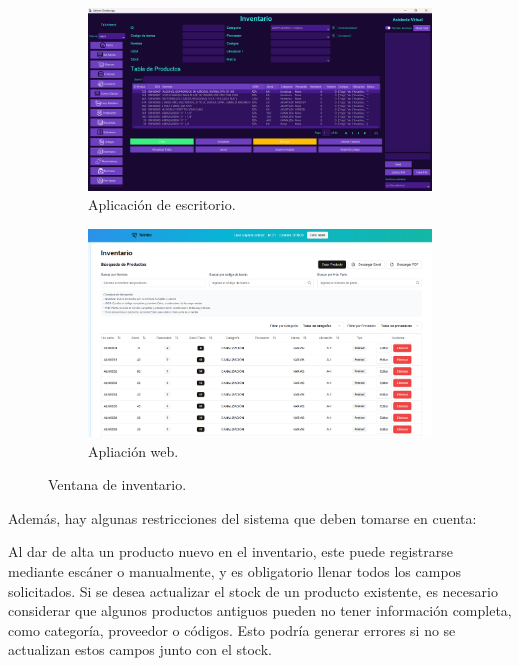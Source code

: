 \begin{figure}[ht!]
\centering
\begin{subfigure}{0.45\textwidth}
    \includegraphics[width=\textwidth]{imgs/InventoryApp.png}
    \caption{Aplicación de escritorio.}
    \label{fig:invent1}
\end{subfigure}
\hfill
\begin{subfigure}{0.45\textwidth}
    \includegraphics[width=\textwidth]{imgs/Almacen General/inventario/inventario_1_general.png}
    \caption{Apliación web.}
    \label{fig:invent2}
\end{subfigure}        
\caption{Ventana de inventario.}
\label{fig:inventory}
\end{figure}




Además, hay algunas restricciones del sistema que deben tomarse en cuenta: 

Al dar de alta un producto nuevo en el inventario, este puede registrarse mediante escáner o manualmente, y es obligatorio llenar todos los campos solicitados. Si se desea actualizar el stock de un producto existente, es necesario considerar que algunos productos antiguos pueden no tener información completa, como categoría, proveedor o códigos. Esto podría generar errores si no se actualizan estos campos junto con el stock. 

